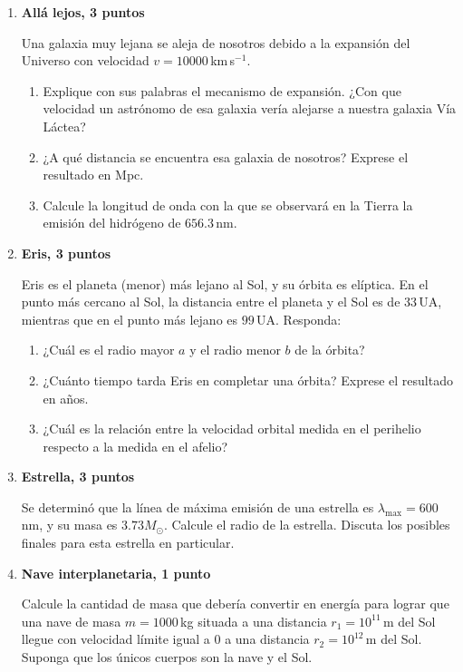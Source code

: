 \documentclass[a4paper,12pt]{article}
\begin{document}
\begin{enumerate}

\item{\bf{Allá lejos, 3 puntos}}

Una galaxia muy lejana se aleja de nosotros debido a la expansión del Universo
con velocidad $v=10000$\,km\,s$^{-1}$. 
\begin{enumerate}
\item Explique con sus palabras el mecanismo de expansión. ¿Con que velocidad
un astrónomo de esa galaxia vería alejarse a nuestra galaxia Vía Láctea? 
\item ¿A qué distancia se encuentra esa galaxia de nosotros? Exprese el
resultado en Mpc.
\item Calcule la longitud de onda con la que se observará en la Tierra la
emisión del hidrógeno de $656.3$\,nm.
\end{enumerate}


\item{\bf{Eris, 3 puntos}}

Eris es el planeta (menor) más lejano al Sol, y su órbita es elíptica. En el
punto más cercano al Sol, la distancia entre el planeta y el Sol es de
$33$\,UA, mientras que en el punto más lejano es $99$\,UA. Responda: 
\begin{enumerate}
\item ¿Cuál es el radio mayor $a$ y el radio menor $b$ de la órbita? 
\item ¿Cuánto tiempo tarda Eris en completar una órbita? Exprese el resultado
en años.
\item ¿Cuál es la relación entre la velocidad orbital medida en el perihelio
respecto a la medida en el afelio?
\end{enumerate} 

\item{\bf{Estrella, 3 puntos}}

Se determinó que la línea de máxima emisión de una estrella es
$\lambda_{\max}=600$\,nm, y su masa es $3.73 M_\odot$. Calcule el radio de la
estrella. Discuta los posibles finales para esta estrella en particular.

\item {\bf{Nave interplanetaria, 1 punto}}

Calcule la cantidad de masa que debería convertir en energía para lograr que una
nave de masa $m=1000$\,kg situada a una distancia $r_1=10^{11}$\,m del Sol llegue 
con velocidad límite igual a 0 a una distancia $r_2=10^{12}$\,m del Sol. Suponga 
que los únicos cuerpos son la nave y el Sol.

\end{enumerate}
\end{document}
